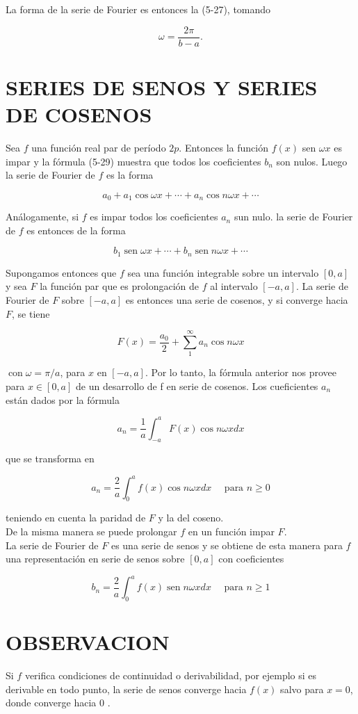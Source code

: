 \documentclass[10pt]{article}
\theoremstyle{plain}
\theoremstyle{definition}
\theoremstyle{remark}
\begin{document}
La forma de la serie de Fourier es entonces la (5-27), tomando

$$
\omega=\frac{2 \pi}{b-a} .
$$

\section*{SERIES DE SENOS Y SERIES DE COSENOS}
Sea $f$ una función real par de período $2 p$. Entonces la función $f(x)$ sen $\omega x$ es impar y la fórmula (5-29) muestra que todos los coeficientes $b_{n}$ son nulos. Luego la serie de Fourier de $f$ es la forma

$$
a_{0}+a_{1} \cos \omega x+\cdots+a_{n} \cos n \omega x+\cdots
$$

Análogamente, si $f$ es impar todos los coeficientes $a_{n}$ sun nulo. la serie de Fourier de $f$ es entonces de la forma

$$
b_{1} \operatorname{sen} \omega x+\cdots+b_{n} \operatorname{sen} n \omega x+\cdots
$$

Supongamos entonces que $f$ sea una función integrable sobre un intervalo $[0, a]$ y sea $F$ la función par que es prolongación de $f$ al intervalo $[-a, a]$. La serie de Fourier de $F$ sobre $[-a, a]$ es entonces una serie de cosenos, y si converge hacia $F$, se tiene

$$
F(x)=\frac{a_{0}}{2}+\sum_{1}^{\infty} a_{n} \cos n \omega x
$$

$\operatorname{con} \omega=\pi / a$, para $x$ en $[-a, a]$. Por lo tanto, la fórmula anterior nos provee para $x \in[0, a]$ de un desarrollo de f en serie de cosenos. Los cueficientes $a_{n}$ están dados por la fórmula

$$
a_{n}=\frac{1}{a} \int_{-a}^{a} F(x) \cos n \omega x d x
$$

que se transforma en

$$
a_{n}=\frac{2}{a} \int_{0}^{a} f(x) \cos n \omega x d x \quad \text { para } n \geqslant 0
$$

teniendo en cuenta la paridad de $F$ y la del coseno.\\
De la misma manera se puede prolongar $f$ en un función impar $F$.\\
La serie de Fourier de $F$ es una serie de senos y se obtiene de esta manera para $f$ una representación en serie de senos sobre $[0, a]$ con coeficientes

$$
b_{n}=\frac{2}{a} \int_{0}^{a} f(x) \operatorname{sen} n \omega x d x \quad \text { para } n \geqslant 1
$$

\section*{OBSERVACION}
Si $f$ verifica condiciones de continuidad o derivabilidad, por ejemplo si es derivable en todo punto, la serie de senos converge hacia $f(x)$ salvo para $x=0$, donde converge hacia 0 .
\end{document}
